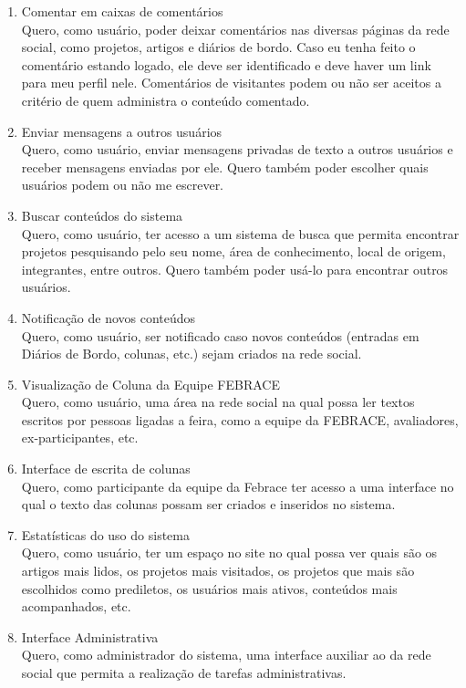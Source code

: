 \begin{enumerate}
    \item Comentar em caixas de comentários \\
      Quero, como usuário, poder deixar comentários nas diversas páginas da rede social, como projetos, artigos e diários de bordo. Caso eu tenha feito o comentário estando logado, ele deve ser identificado e deve haver um link para meu perfil nele. Comentários de visitantes podem ou não ser aceitos a critério de quem administra o conteúdo comentado.
    \item Enviar mensagens a outros usuários \\
      Quero, como usuário, enviar mensagens privadas de texto a outros usuários e receber mensagens enviadas por ele. Quero também poder escolher quais usuários podem ou não me escrever.
    \item Buscar conteúdos do sistema \\
      Quero, como usuário, ter acesso a  um sistema de busca que permita encontrar projetos pesquisando pelo seu nome, área de conhecimento, local de origem, integrantes, entre outros. Quero também poder usá-lo para encontrar outros usuários.
    \item Notificação de novos conteúdos \\
      Quero, como usuário, ser notificado caso novos conteúdos (entradas em Diários de Bordo, colunas, etc.) sejam criados na rede social.
    \item Visualização de Coluna da Equipe FEBRACE \\
      Quero, como usuário, uma área na rede social na qual possa ler textos escritos por pessoas ligadas a feira, como a equipe da FEBRACE, avaliadores, ex-participantes, etc.
    \item Interface de escrita de colunas \\
      Quero, como participante da equipe da Febrace ter acesso a uma interface no qual o texto das colunas possam ser criados e inseridos no sistema.
    \item Estatísticas do uso do sistema \\
      Quero, como usuário, ter um espaço no site no qual possa ver quais são os artigos mais lidos, os projetos mais visitados, os projetos que mais são escolhidos como prediletos, os usuários mais ativos, conteúdos mais acompanhados, etc.
    \item Interface Administrativa \\
      Quero, como administrador do sistema, uma interface auxiliar ao da rede social que permita a realização de tarefas administrativas.

\end{enumerate}
